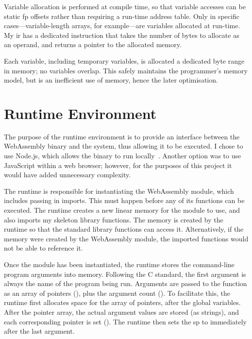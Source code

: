 \documentclass[00-main.tex]{subfiles}
\begin{document}
Variable allocation is performed at compile time, so that variable accesses can be static \gls{fp} offsets rather than requiring a run-time address table.
Only in specific cases---variable-length arrays, for example---are variables allocated at run-time.
My \gls{ir} has a dedicated  instruction that takes the number of bytes to allocate as an operand, and returns a pointer to the allocated memory.

Each variable, including temporary variables, is allocated a dedicated byte range in memory; no variables overlap.
This safely maintains the programmer's memory model, but is an inefficient use of memory, hence the later optimisation.

\section{Runtime Environment}\label{sec:impl:runtime}

The purpose of the runtime environment is to provide an interface between the WebAssembly binary and the system, thus allowing it to be executed.
I chose to use Node.js, which allows the binary to run locally~.
Another option was to use JavaScript within a web browser; however, for the purposes of this project it would have added unnecessary complexity.

The runtime is responsible for instantiating the WebAssembly module, which includes passing in imports.
This must happen before any of its functions can be executed.
The runtime creates a new linear memory for the module to use, and also imports my skeleton library functions.
The memory is created by the runtime so that the standard library functions can access it.
Alternatively, if the memory were created by the WebAssembly module, the imported functions would not be able to reference it.

Once the module has been instantiated, the runtime stores the command-line program arguments into memory.
Following the C standard, the first argument is always the name of the program being run.
Arguments are passed to the  function as an array of  pointers (), plus the argument count ().
To facilitate this, the runtime first allocates space for the array of pointers, after the global variables.
After the pointer array, the actual argument values are stored (as strings), and each corresponding pointer is set ().
The runtime then sets the \gls{sp} to immediately after the last argument.
\end{document}
